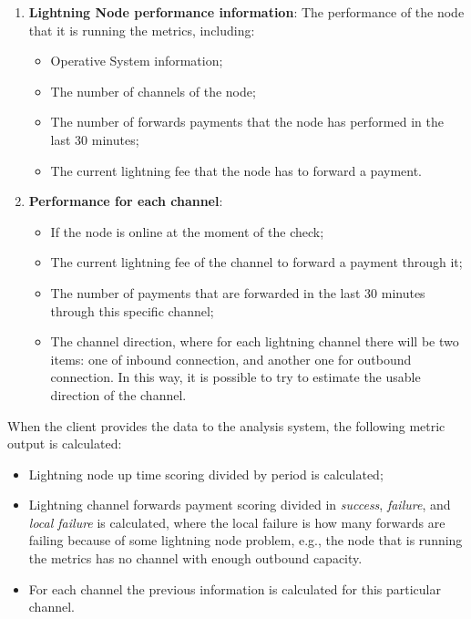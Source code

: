 \begin{enumerate}
    \item {\bf Lightning Node performance information}: The performance of the node that it is running
        the metrics, including:
        \begin{itemize}
           \item Operative System information;
           \item The number of channels of the node;
           \item The number of forwards payments that the node has performed in the 
               last 30 minutes;
           \item The current lightning fee that the node has to 
               forward a payment.
        \end{itemize}
    \item {\bf Performance for each channel}:
    \begin{itemize}
        \item If the node is online at the moment of the check;
        \item The current lightning fee of the channel to forward a payment through it;
        \item The number of payments that are forwarded in the last 30 minutes through this specific 
            channel;
        \item The channel direction, where for each lightning channel there will be two items: one of 
            inbound connection, and another one for outbound connection. In this way, it is possible to 
            try to estimate the usable direction of the channel.
    \end{itemize}
\end{enumerate}

When the client provides the data to the analysis system, the following metric 
output is calculated:

\begin{itemize}
    \item Lightning node up time scoring divided by period is calculated;
    \item Lightning channel forwards payment scoring divided in \emph{success}, \emph{failure}, and \emph{local failure}
        is calculated, where the local failure is how many forwards are failing because of some lightning node problem,
        e.g., the node that is running the metrics has no channel with enough outbound capacity. 
    \item For each channel the previous information is calculated for this particular channel.
\end{itemize}


